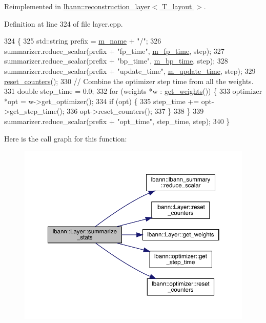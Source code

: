Reimplemented in \hyperlink{classlbann_1_1reconstruction__layer_a09bf00610af66810bf8bbb65424d1e1a}{lbann\+::reconstruction\+\_\+layer$<$ T\+\_\+layout $>$}.



Definition at line 324 of file layer.\+cpp.


\begin{DoxyCode}
324                                                                \{
325   std::string prefix = \hyperlink{classlbann_1_1Layer_aa47109ad09b399142fa92f9d3702189f}{m\_name} + \textcolor{stringliteral}{"/"};
326   summarizer.reduce\_scalar(prefix + \textcolor{stringliteral}{"fp\_time"}, \hyperlink{classlbann_1_1Layer_ab1bd9ab0a6f9e554f4dc936d8316028e}{m\_fp\_time}, step);
327   summarizer.reduce\_scalar(prefix + \textcolor{stringliteral}{"bp\_time"}, \hyperlink{classlbann_1_1Layer_aa60fc41627bcaa9c345775bf5737bb45}{m\_bp\_time}, step);
328   summarizer.reduce\_scalar(prefix + \textcolor{stringliteral}{"update\_time"}, \hyperlink{classlbann_1_1Layer_ab7d84533662b02d01ba6685ad6f20935}{m\_update\_time}, step);
329   \hyperlink{classlbann_1_1Layer_a979bb6891e6bf5edba2184cd0b59cf54}{reset\_counters}();
330   \textcolor{comment}{// Combine the optimizer step time from all the weights.}
331   \textcolor{keywordtype}{double} step\_time = 0.0;
332   \textcolor{keywordflow}{for} (weights *w : \hyperlink{classlbann_1_1Layer_a4ee78d42284421519dd18d27b4da0957}{get\_weights}()) \{
333     optimizer *opt = w->get\_optimizer();
334     \textcolor{keywordflow}{if} (opt) \{
335       step\_time += opt->get\_step\_time();
336       opt->reset\_counters();
337     \}
338   \}
339   summarizer.reduce\_scalar(prefix + \textcolor{stringliteral}{"opt\_time"}, step\_time, step);
340 \}
\end{DoxyCode}
Here is the call graph for this function\+:\nopagebreak
\begin{figure}[H]
\begin{center}
\leavevmode
\includegraphics[width=350pt]{classlbann_1_1Layer_a7f3f26e2ae0497f9a00fd6bc56b50543_cgraph}
\end{center}
\end{figure}
